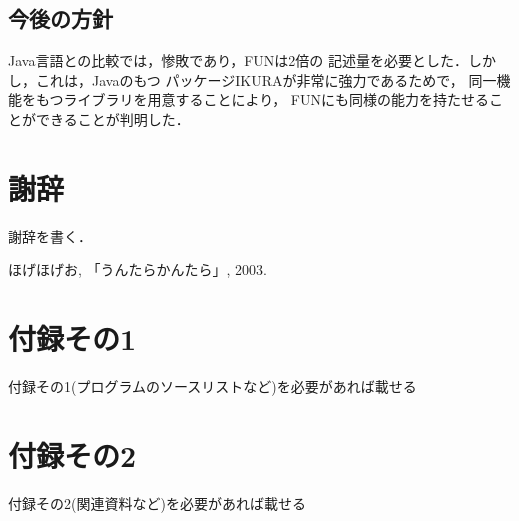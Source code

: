 \documentclass{funthesis}
\begin{document}
\section{今後の方針}

Java言語との比較では，惨敗であり，FUNは2倍の
記述量を必要とした．しかし，これは，Javaのもつ
パッケージIKURAが非常に強力であるためで，
同一機能をもつライブラリを用意することにより，
FUNにも同様の能力を持たせることができることが判明した．


\chapter*{謝辞}

謝辞を書く．


\begin{thebibliography}{9}
  ほげほげお, 「うんたらかんたら」, 2003.
\end{thebibliography}


\appendix

\chapter*{付録その1} %

付録その1(プログラムのソースリストなど)を必要があれば載せる

\chapter*{付録その2}

付録その2(関連資料など)を必要があれば載せる

\listoffigures

\listoftables
\end{document}
